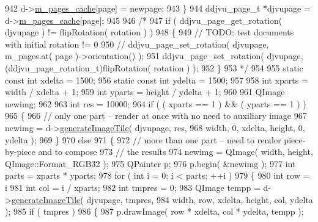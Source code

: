 \begin{DoxyCode}
942         d->\hyperlink{classKDjVu_1_1Private_a7c2361a6591fe13e69bc7982a3efd780}{m\_pages\_cache}[page] = newpage;
943     \}
944     ddjvu\_page\_t *djvupage = d->\hyperlink{classKDjVu_1_1Private_a7c2361a6591fe13e69bc7982a3efd780}{m\_pages\_cache}[page];
945 
946 \textcolor{comment}{/*}
947 \textcolor{comment}{    if ( ddjvu\_page\_get\_rotation( djvupage ) != flipRotation( rotation ) )}
948 \textcolor{comment}{    \{}
949 \textcolor{comment}{// TODO: test documents with initial rotation != 0}
950 \textcolor{comment}{//        ddjvu\_page\_set\_rotation( djvupage, m\_pages.at( page )->orientation() );}
951 \textcolor{comment}{        ddjvu\_page\_set\_rotation( djvupage, (ddjvu\_page\_rotation\_t)flipRotation( rotation ) );}
952 \textcolor{comment}{    \}}
953 \textcolor{comment}{*/}
954 
955     \textcolor{keyword}{static} \textcolor{keyword}{const} \textcolor{keywordtype}{int} xdelta = 1500;
956     \textcolor{keyword}{static} \textcolor{keyword}{const} \textcolor{keywordtype}{int} ydelta = 1500;
957 
958     \textcolor{keywordtype}{int} xparts = width / xdelta + 1;
959     \textcolor{keywordtype}{int} yparts = height / ydelta + 1;
960 
961     QImage newimg;
962 
963     \textcolor{keywordtype}{int} res = 10000;
964     \textcolor{keywordflow}{if} ( ( xparts == 1 ) && ( yparts == 1 ) )
965     \{
966          \textcolor{comment}{// only one part -- render at once with no need to auxiliary image}
967          newimg = d->\hyperlink{classKDjVu_1_1Private_aeb06ba931fdafc7b463603fb7481d477}{generateImageTile}( djvupage, res,
968                  width, 0, xdelta, height, 0, ydelta );
969     \}
970     \textcolor{keywordflow}{else}
971     \{
972         \textcolor{comment}{// more than one part -- need to render piece-by-piece and to compose}
973         \textcolor{comment}{// the results}
974         newimg = QImage( width, height, QImage::Format\_RGB32 );
975         QPainter p;
976         p.begin( &newimg );
977         \textcolor{keywordtype}{int} parts = xparts * yparts;
978         \textcolor{keywordflow}{for} ( \textcolor{keywordtype}{int} i = 0; i < parts; ++i )
979         \{
980             \textcolor{keywordtype}{int} row = i %
981             \textcolor{keywordtype}{int} col = i / xparts;
982             \textcolor{keywordtype}{int} tmpres = 0;
983             QImage tempp = d->\hyperlink{classKDjVu_1_1Private_aeb06ba931fdafc7b463603fb7481d477}{generateImageTile}( djvupage, tmpres,
984                     width, row, xdelta, height, col, ydelta );
985             \textcolor{keywordflow}{if} ( tmpres )
986             \{
987                 p.drawImage( row * xdelta, col * ydelta, tempp );

\end{DoxyCode}
